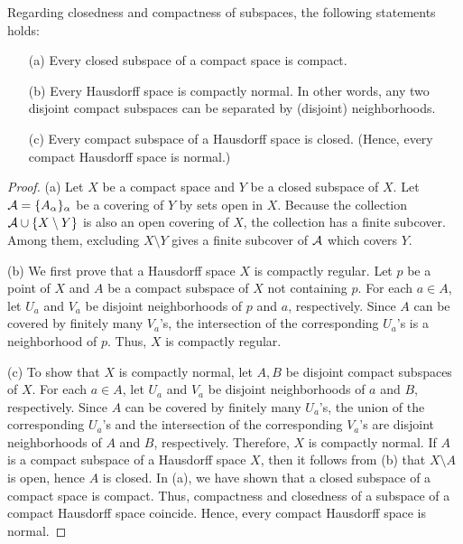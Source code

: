 \begin{thm}
    Regarding closedness and compactness of subspaces, the following statements holds:
    \begin{enumerate}
        \item[(a)]
        {
            Every closed subspace of a compact space is compact.
        }
        \item[(b)]
        {
            Every Hausdorff space is compactly normal.
            In other words, any two disjoint compact subspaces can be separated by (disjoint) neighborhoods.
        }
        \item[(c)]
        {
            Every compact subspace of a Hausdorff space is closed. (Hence, every compact Hausdorff space is normal.)
        }
    \end{enumerate}
\end{thm}
\begin{proof}
    \hangindent=0.65cm
    \noindent(a)
    Let $X$ be a compact space and $Y$ be a closed subspace of $X$.
    Let ${\mathcal{A}}=\{A_\alpha\}_\alpha$ be a covering of $Y$ by sets open in $X$.
    Because the collection ${\mathcal{A}}\cup\{X\setminus Y\}$ is also an open covering of $X$, the collection has a finite subcover.
    Among them, excluding $X\setminus Y$ gives a finite subcover of ${\mathcal{A}}$ which covers $Y$.

    \noindent(b)
    We first prove that a Hausdorff space $X$ is compactly regular.
    Let $p$ be a point of $X$ and $A$ be a compact subspace of $X$ not containing $p$.
    For each $a\in A$, let $U_a$ and $V_a$ be disjoint neighborhoods of $p$ and $a$, respectively.
    Since $A$ can be covered by finitely many $V_a$'s, the intersection of the corresponding $U_a$'s is a neighborhood of $p$.
    Thus, $X$ is compactly regular.

    \noindent(c)
    To show that $X$ is compactly normal, let $A, B$ be disjoint compact subspaces of $X$.
    For each $a\in A$, let $U_a$ and $V_a$ be disjoint neighborhoods of $a$ and $B$, respectively.
    Since $A$ can be covered by finitely many $U_a$'s, the union of the corresponding $U_a$'s and the intersection of the corresponding $V_a$'s are disjoint neighborhoods of $A$ and $B$, respectively.
    Therefore, $X$ is compactly normal.
    If $A$ is a compact subspace of a Hausdorff space $X$, then it follows from (b) that $X\setminus A$ is open, hence $A$ is closed.
    In (a), we have shown that a closed subspace of a compact space is compact.
    Thus, compactness and closedness of a subspace of a compact Hausdorff space coincide.
    Hence, every compact Hausdorff space is normal.
\end{proof}

